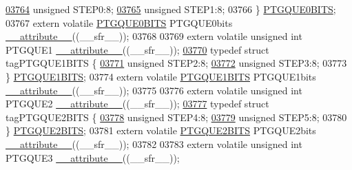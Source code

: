 \begin{DoxyCode}
\hypertarget{a00015_source_l03764}{}\hyperlink{a00014_a1fe0ff616ef1e3159f78b8111cd29c14}{03764}   \textcolor{keywordtype}{unsigned} STEP0:8;
\hypertarget{a00015_source_l03765}{}\hyperlink{a00014_a710e326aeb187e647bcd4ad2ed978852}{03765}   \textcolor{keywordtype}{unsigned} STEP1:8;
03766 \} \hyperlink{a00014_d1/d97/a00670}{PTGQUE0BITS};
03767 \textcolor{keyword}{extern} \textcolor{keyword}{volatile} \hyperlink{a00014_d1/d97/a00670}{PTGQUE0BITS} PTGQUE0bits \hyperlink{a00015_a493c46f03454991ccc5aa7a6e1dfb2a7}{\_\_attribute\_\_}((\_\_sfr\_\_));
03768 
03769 \textcolor{keyword}{extern} \textcolor{keyword}{volatile} \textcolor{keywordtype}{unsigned} \textcolor{keywordtype}{int}  PTGQUE1 \hyperlink{a00015_a493c46f03454991ccc5aa7a6e1dfb2a7}{\_\_attribute\_\_}((\_\_sfr\_\_));
\hypertarget{a00015_source_l03770}{}\hyperlink{a00014}{03770} \textcolor{keyword}{typedef} \textcolor{keyword}{struct }tagPTGQUE1BITS \{
\hypertarget{a00015_source_l03771}{}\hyperlink{a00014_aca9500142aaf3806d63cbe46689b1587}{03771}   \textcolor{keywordtype}{unsigned} STEP2:8;
\hypertarget{a00015_source_l03772}{}\hyperlink{a00014_a03d161459a4f4a6606b268647becc896}{03772}   \textcolor{keywordtype}{unsigned} STEP3:8;
03773 \} \hyperlink{a00014_d8/d13/a00671}{PTGQUE1BITS};
03774 \textcolor{keyword}{extern} \textcolor{keyword}{volatile} \hyperlink{a00014_d8/d13/a00671}{PTGQUE1BITS} PTGQUE1bits \hyperlink{a00015_a493c46f03454991ccc5aa7a6e1dfb2a7}{\_\_attribute\_\_}((\_\_sfr\_\_));
03775 
03776 \textcolor{keyword}{extern} \textcolor{keyword}{volatile} \textcolor{keywordtype}{unsigned} \textcolor{keywordtype}{int}  PTGQUE2 \hyperlink{a00015_a493c46f03454991ccc5aa7a6e1dfb2a7}{\_\_attribute\_\_}((\_\_sfr\_\_));
\hypertarget{a00015_source_l03777}{}\hyperlink{a00014}{03777} \textcolor{keyword}{typedef} \textcolor{keyword}{struct }tagPTGQUE2BITS \{
\hypertarget{a00015_source_l03778}{}\hyperlink{a00014_ace6f970f30e4d726b8d4499699405132}{03778}   \textcolor{keywordtype}{unsigned} STEP4:8;
\hypertarget{a00015_source_l03779}{}\hyperlink{a00014_a77411fdbb7bd3b22af9293b198b06508}{03779}   \textcolor{keywordtype}{unsigned} STEP5:8;
03780 \} \hyperlink{a00014_d5/d40/a00672}{PTGQUE2BITS};
03781 \textcolor{keyword}{extern} \textcolor{keyword}{volatile} \hyperlink{a00014_d5/d40/a00672}{PTGQUE2BITS} PTGQUE2bits \hyperlink{a00015_a493c46f03454991ccc5aa7a6e1dfb2a7}{\_\_attribute\_\_}((\_\_sfr\_\_));
03782 
03783 \textcolor{keyword}{extern} \textcolor{keyword}{volatile} \textcolor{keywordtype}{unsigned} \textcolor{keywordtype}{int}  PTGQUE3 \hyperlink{a00015_a493c46f03454991ccc5aa7a6e1dfb2a7}{\_\_attribute\_\_}((\_\_sfr\_\_));

\end{DoxyCode}
